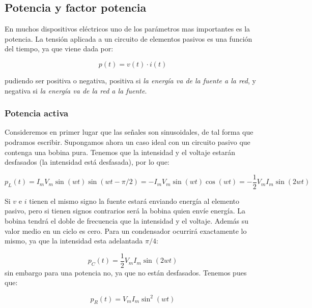 \documentclass[12pt]{article}
\begin{document}
\subsection{Potencia y factor potencia}

En muchos dispositivos eléctricos uno de los parámetros mas importantes es la potencia. La tensión aplicada a un circuito de elementos pasivos es una función del tiempo, ya que viene dada por:

\begin{equation}
p(t) = v(t) \cdot i(t)
\end{equation}

pudiendo ser positiva o negativa, positiva si \textit{la energía va de la fuente a la red}, y negativa si \textit{la energía va de la red a la fuente}. 


\subsubsection{Potencia activa}
Consideremos en primer lugar que las señales son sinusoidales, de tal forma que podramos escribir. Supongamos ahora un caso ideal con un circuito pasivo que contenga una bobina pura. Tenemos que la intensidad y el voltaje estarán desfasados (la intensidad está desfasada), por lo que: 

\begin{equation}
p_L(t) = I_m V_m \sin (w t) \sin (w t - \pi/2) = - I_m V_m \sin (wt) \cos(wt) = -\dfrac{1}{2} V_m I_m \sin (2 wt)
\end{equation}

Si $v$ e $i$ tienen el mismo signo la fuente estará enviando energía al elemento pasivo, pero si tienen signos contrarios será la bobina quien envíe energía. La bobina tendrá el doble de frecuencia que la intensidad y el voltaje. Además su valor medio en un ciclo es cero. Para un condensador ocurrirá exactamente lo mismo, ya que la intensidad esta adelantada $\pi/4$:

\begin{equation}
p_C (t) = \dfrac{1}{2} V_m I_m \sin (2wt)
\end{equation}
sin embargo para una potencia no, ya que no están desfasados. Tenemos pues que:

\begin{equation}
p_R (t) = V_m I_m \sin^2 (wt) 
\end{equation}
\end{document}
